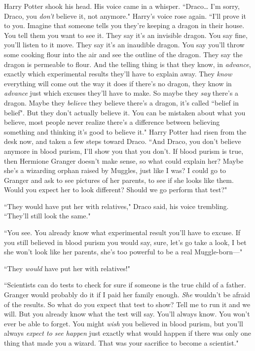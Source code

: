 Harry Potter shook his head. His voice came in a whisper. ``Draco{\ldots} I'm sorry, Draco, you \emph{don't} believe it, not anymore." Harry's voice rose again. ``I'll prove it to you. Imagine that someone tells you they're keeping a dragon in their house. You tell them you want to see it. They say it's an invisible dragon. You say fine, you'll listen to it move. They say it's an inaudible dragon. You say you'll throw some cooking flour into the air and see the outline of the dragon. They say the dragon is permeable to flour. And the telling thing is that they know, in \emph{advance}, exactly which experimental results they'll have to explain away. They \emph{know} everything will come out the way it does if there's no dragon, they know in \emph{advance} just which excuses they'll have to make. So maybe they \emph{say} there's a dragon. Maybe they \emph{believe} they believe there's a dragon, it's called ``belief in belief". But they don't actually believe it. You can be mistaken about what you believe, most people never realize there's a difference between believing something and thinking it's good to believe it." Harry Potter had risen from the desk now, and taken a few steps toward Draco. ``And Draco, you don't believe anymore in blood purism, I'll show you that you don't. If blood purism is true, then Hermione Granger doesn't make sense, so what could explain her? Maybe she's a wizarding orphan raised by Muggles, just like I was? I could go to Granger and ask to see pictures of her parents, to see if she looks like them. Would you expect her to look different? Should we go perform that test?"

``They would have put her with relatives," Draco said, his voice trembling. ``They'll still look the same."

``You see. You already know what experimental result you'll have to excuse. If you still believed in blood purism you would say, sure, let's go take a look, I bet she won't look like her parents, she's too powerful to be a real Muggle-born—"

``They \emph{would} have put her with relatives!"

``Scientists can do tests to check for sure if someone is the true child of a father. Granger would probably do it if I paid her family enough. \emph{She} wouldn't be afraid of the results. So what do you expect that test to show? Tell me to run it and we will. But you already know what the test will say. You'll always know. You won't ever be able to forget. You might \emph{wish} you believed in blood purism, but you'll always \emph{expect to see happen} just exactly what would happen if there was only one thing that made you a wizard. That was your sacrifice to become a scientist."

